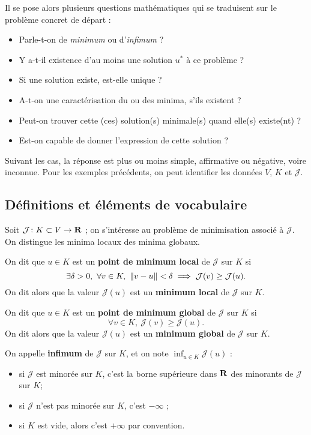 \documentclass[grape]{../ceri/sty/MasterNotes}
\newcommand\J{\mathcal J}
\begin{document}
Il se pose alors plusieurs questions mathématiques qui se traduisent sur le problème concret de départ :
\begin{itemize}
    \item Parle-t-on de \textit{minimum} ou d'\textit{infimum} ?
    \item Y a-t-il existence d'au moins une solution $u^*$ à ce problème ?
    \item Si une solution existe, est-elle unique ?
    \item A-t-on une caractérisation du ou des minima, s'ils existent ?
    \item Peut-on trouver cette (ces) solution(s) minimale(s) quand elle(s) existe(nt) ?
    \item Est-on capable de donner l'expression de cette solution ?
\end{itemize}

Suivant les cas, la réponse est plus ou moins simple, affirmative ou négative, voire inconnue. Pour les exemples précédents, on peut identifier les données $V$, $K$ et $\J$.

\subsection{Définitions et éléments de vocabulaire}

Soit $\J\colon K\subset V\to\R$ ; on s'intéresse au problème de minimisation associé à $\J$. On distingue les minima locaux des minima globaux.

\begin{defin}
    On dit que $u\in K$ est un \textbf{point de minimum local} de $\J$ sur $K$ si
    \[ \exists \delta>0,\ \forall v\in K,\ \norme{v-u}<\delta\implies\J(v)\ge\J(u). \]
    On dit alors que la valeur $\J(u)$ est un \textbf{minimum local} de $\J$ sur $K$.
\end{defin}

\begin{defin}
    On dit que $u\in K$ est un \textbf{point de minimum global} de $\J$ sur $K$ si
    \[ \forall v\in K,\ \J(v)\ge\J(u). \]
    On dit alors que la valeur $\J(u)$ est un \textbf{minimum global} de $\J$ sur $K$.
\end{defin}

\begin{defin}
    On appelle \textbf{infimum} de $\J$ sur $K$, et on note $\displaystyle\inf_{u\in K}\J(u)$ :
    \begin{itemize}[wide]
        \item si $\J$ est minorée sur $K$, c'est la borne supérieure dans $\mathbf{R}$ des minorants de $\J$ sur $K$;
        \item si $\J$ n'est pas minorée sur $K$, c'est $-\infty$ ;
        \item si $K$ est vide, alors c'est $+\infty$ par convention.
    \end{itemize}
\end{defin}
\end{document}
